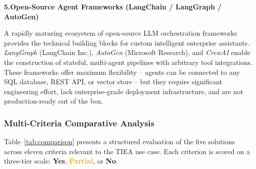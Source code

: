 \documentclass[12pt,a4paper]{report}
\newcommand{\sys}[1]{\textit{\color{talanblue}#1}}
\begin{document}
\medskip
\noindent\textbf{\color{talannavy}5.\quad Open-Source Agent Frameworks
  (LangChain / LangGraph / AutoGen)}

\smallskip\noindent
A rapidly maturing ecosystem of open-source LLM orchestration frameworks provides the technical
building blocks for custom intelligent enterprise assistants.
\sys{LangGraph} (LangChain Inc.), \sys{AutoGen} (Microsoft Research), and \sys{CrewAI} enable the
construction of stateful, multi-agent pipelines with arbitrary tool integrations.
These frameworks offer maximum flexibility -- agents can be connected to any SQL database, REST API,
or vector store -- but they require significant engineering effort, lack enterprise-grade deployment
infrastructure, and are not production-ready out of the box.

\subsubsection{Multi-Criteria Comparative Analysis}

Table~\ref{tab:comparison} presents a structured evaluation of the five solutions across eleven
criteria relevant to the TIEA use case.
Each criterion is scored on a three-tier scale:
\textcolor{okgreen}{\textbf{Yes}},
\textcolor{orange}{\textbf{Partial}}, or
\textcolor{warnred}{\textbf{No}}.
\end{document}
